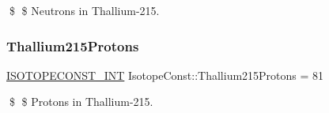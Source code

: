 \$ \$ Neutrons in Thallium-\/215. \mbox{\label{group___isotope_const-_thallium-_tl215_gadf191ed9053cd04592731d7380e7a02c}} 
\subsubsection{\texorpdfstring{Thallium215\+Protons}{Thallium215Protons}}
{\footnotesize\ttfamily \mbox{\hyperlink{group___isotope_const-_macros_ga5f18360b3e99483a35c32d789e62621c}{I\+S\+O\+T\+O\+P\+E\+C\+O\+N\+S\+T\+\_\+\+I\+NT}} Isotope\+Const\+::\+Thallium215\+Protons = 81}

\$ \$ Protons in Thallium-\/215. 